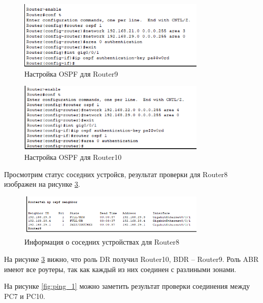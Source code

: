 \begin{figure}[H]
    \centering
    \includegraphics[width=0.8\textwidth]{img/content/router9.png}
    \caption{Настройка OSPF для Router9}
    \label{fig:router9}
\end{figure}

\begin{figure}[H]
    \centering
    \includegraphics[width=0.8\textwidth]{img/content/router10.png}
    \caption{Настройка OSPF для Router10}
    \label{fig:router10}
\end{figure}

Просмотрим статус соседних устройсв, результат проверки для Router8 изображен на рисунке \ref{fig:neighbor}.

\begin{figure}[H]
    \centering
    \includegraphics[width=0.8\textwidth]{img/content/router8_neighbor.png}
    \caption{Информация о соседних устройствах для Router8}
    \label{fig:neighbor}
\end{figure}

На рисунке \ref{fig:neighbor} вижно, что роль DR получил Router10, BDR -- Router9. Роль ABR имеют все роутеры, так как каждый из них соединен с разлиными зонами.

На рисунке \ref{fig:ping_1} можно заметить результат проверки соединения между PC7 и PC10.

